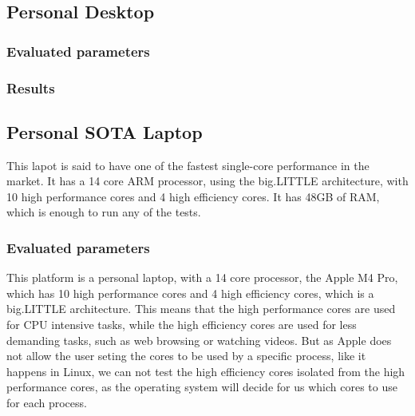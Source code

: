 


\subsection{Personal Desktop}
\subsubsection{Evaluated parameters}
\subsubsection{Results}

\subsection{Personal SOTA Laptop}
This lapot is said to have one of the fastest single-core performance in the market. It has a 14 core ARM processor, using the big.LITTLE architecture, with 10 high performance cores and 4 high efficiency cores. It has 48GB of RAM, which is enough to run any of the tests.


\subsubsection{Evaluated parameters}

This platform is a personal laptop, with a 14 core processor, the Apple M4 Pro, which has 10 high performance cores and 4 high efficiency cores, which is a big.LITTLE architecture. This means that the high performance cores are used for CPU intensive tasks, while the high efficiency cores are used for less demanding tasks, such as web browsing or watching videos. But as Apple does not allow the user seting the cores to be used by a specific process, like it happens in Linux, we can not test the high efficiency cores isolated from the high performance cores, as the operating system will decide for us which cores to use for each process. 



